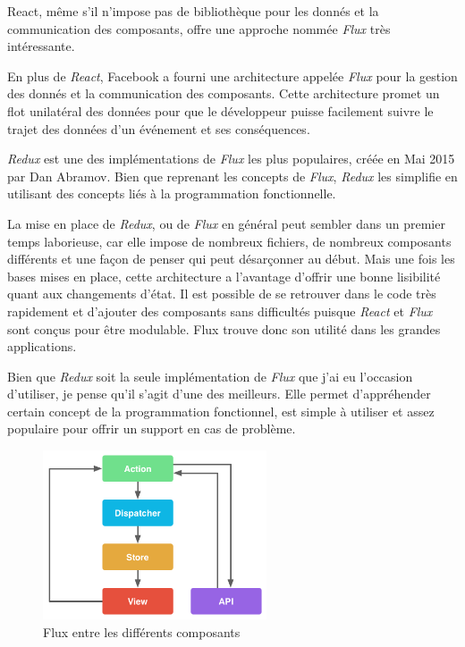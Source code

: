 \documentclass[12pt,a4paper]{article}
\begin{document}
  \bigskip

  React, même s'il n'impose pas de bibliothèque pour les donnés et la
  communication des composants, offre une approche nommée \emph{Flux} très
  intéressante.

  \bigskip

  En plus de \emph{React}, Facebook a fourni une architecture appelée
  \emph{Flux} pour la gestion des donnés et la communication des
  composants. Cette architecture promet un flot unilatéral des données
  pour que le développeur puisse facilement suivre le trajet des données
  d'un événement et ses conséquences.

  \bigskip

  \emph{Redux} est une des implémentations de \emph{Flux} les plus
  populaires, créée en Mai 2015 par Dan Abramov. Bien que reprenant les
  concepts de \emph{Flux}, \emph{Redux} les simplifie en utilisant des
  concepts liés à la programmation fonctionnelle.

  \bigskip

  La mise en place de \emph{Redux}, ou de \emph{Flux} en général peut
  sembler dans un premier temps laborieuse, car elle impose de nombreux
  fichiers, de nombreux composants différents et une façon de penser qui
  peut désarçonner au début. Mais une fois les bases mises en place, cette
  architecture a l'avantage d'offrir une bonne lisibilité quant aux
  changements d'état. Il est possible de se retrouver dans le code très
  rapidement et d'ajouter des composants sans difficultés puisque
  \emph{React} et \emph{Flux} sont conçus pour être modulable. Flux trouve
  donc son utilité dans les grandes applications.

  \bigskip

  Bien que \emph{Redux} soit la seule implémentation de \emph{Flux} que
  j'ai eu l'occasion d'utiliser, je pense qu'il s'agit d'une des
  meilleurs. Elle permet d'appréhender certain concept de la programmation
  fonctionnel, est simple à utiliser et assez populaire pour offrir un
  support en cas de problème.

  \bigskip

  \begin{figure}[h]
    \centering
    \includegraphics[height=5cm]{figures/react.png}
    \caption{Flux entre les différents composants}
  \end{figure}
\end{document}

